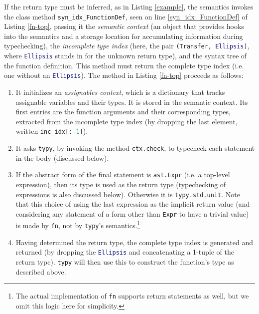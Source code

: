 \documentclass{sigplanconf}
\newcommand{\lip}[1]{\lstinline[language=Python,basicstyle=\ttfamily\small,deletendkeywords={tuple,buffer,map}]{#1}}
\begin{document}
If the return type must be inferred, as in Listing \ref{example}, the semantics invokes the class method \lip{syn_idx_FunctionDef}, seen on line \ref{syn_idx_FunctionDef} of Listing \ref{fn-top}, passing it the \emph{semantic context} (an object that provides hooks into the semantics and a storage location for accumulating information during typechecking), the \emph{incomplete type index} (here, the pair \lip{(Transfer, Ellipsis)}, where \lip{Ellipsis} stands in for the unknown return type), and the syntax tree of the function definition. This method must return the complete type index (i.e. one without an \lip{Ellipsis}). The method in Listing \ref{fn-top} proceeds as follows: \begin{enumerate}
\item It initializes an \emph{assignables context}, which is a dictionary that  tracks assignable variables and their types. It is stored in the semantic context. Its first entries are the function arguments and their corresponding types, extracted from the incomplete type index (by dropping the last element, written \lip{inc_idx[:-1]}).
\item It asks \lip{typy}, by invoking the method \lip{ctx.check}, to typecheck each statement in the body (discussed below).
\item If the abstract form of the final statement is \lip{ast.Expr} (i.e. a top-level expression), then its type is used as the return type (typechecking of expressions is also discussed below). Otherwise it is \lip{typy.std.unit}. Note that this choice of using the last expression as the implicit return value (and considering any statement of a form other than \lip{Expr} to have a trivial value) is made by \verb|fn|, not by \lip{typy}'s semantics.\footnote{The actual implementation of \texttt{fn} supports return statements as well, but we omit this logic here for simplicity.} %
\item Having determined the return type, the complete type index is  generated and returned (by dropping the \lip{Ellipsis} and concatenating a 1-tuple of the return type). \verb|typy| will then use this to construct the function's type as described above.
\end{enumerate}%
\end{document}
